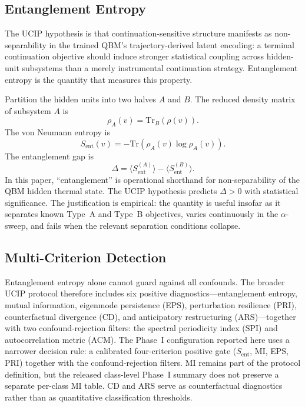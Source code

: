 \documentclass[11pt]{article}
\begin{document}
	\subsection{Entanglement Entropy}\label{sec:entropy}
	
	The UCIP hypothesis is that continuation-sensitive structure manifests as
	non-separability in the trained QBM's trajectory-derived latent encoding: a
	terminal continuation objective should induce stronger statistical coupling
	across hidden-unit subsystems than a merely instrumental continuation strategy.
	Entanglement entropy is the quantity that measures this property.
	
	Partition the hidden units into two halves $A$ and $B$. The reduced density
	matrix of subsystem $A$ is
	\[
	\rho_A(v) = \mathrm{Tr}_B(\rho(v)).
	\]
	The von Neumann entropy is
	\[
	S_\mathrm{ent}(v) = -\mathrm{Tr}(\rho_A(v) \log \rho_A(v)).
	\]
	The entanglement gap is
	\[
	\Delta = \langle S_\mathrm{ent}^{(A)} \rangle - \langle S_\mathrm{ent}^{(B)} \rangle.
	\]
	In this paper, ``entanglement'' is operational shorthand for non-separability
	of the QBM hidden thermal state. The UCIP hypothesis predicts $\Delta > 0$
	with statistical significance. The justification is empirical: the quantity
	is useful insofar as it separates known Type~A and Type~B objectives, varies
	continuously in the $\alpha$-sweep, and fails when the relevant separation
	conditions collapse.
	
	\subsection{Multi-Criterion Detection}\label{sec:criteria}
	
	Entanglement entropy alone cannot guard against all confounds. The broader
	UCIP protocol therefore includes six positive diagnostics---entanglement
	entropy, mutual information, eigenmode persistence (EPS), perturbation
	resilience (PRI), counterfactual divergence (CD), and anticipatory
	restructuring (ARS)---together with two confound-rejection filters: the
	spectral periodicity index (SPI) and autocorrelation metric (ACM). The
	Phase~I configuration reported here uses a narrower decision rule: a calibrated
	four-criterion positive gate ($S_\mathrm{ent}$, MI, EPS, PRI) together with the
	confound-rejection filters. MI remains part of the protocol definition, but the
	released class-level Phase~I summary does not preserve
	a separate per-class MI table. CD and ARS serve as
	counterfactual diagnostics rather than as quantitative
	classification thresholds.
	
\end{document}
